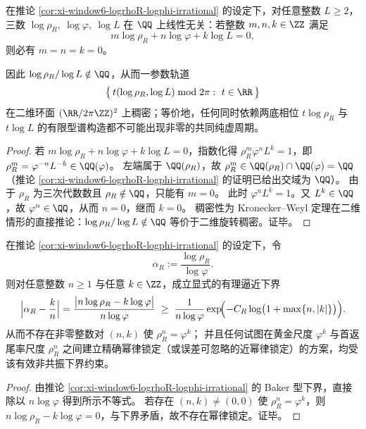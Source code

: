 \begin{corollary}[三底对数的有理线性独立性与二维环面稠密性]\label{cor:xi-window6-logrhoR-logphi-logL-independent}
在推论 \ref{cor:xi-window6-logrhoR-logphi-irrational} 的设定下，对任意整数 \(L\ge 2\)，三数
\(
\log\rho_R,\ \log\varphi,\ \log L
\)
在 \(\QQ\) 上线性无关：若整数 \(m,n,k\in\ZZ\) 满足
\[
m\log\rho_R+n\log\varphi+k\log L=0,
\]
则必有 \(m=n=k=0\)。
\par
因此 \(\log\rho_R/\log L\notin\QQ\)，从而一参数轨道
\[
\bigl\{\,t(\log\rho_R,\log L)\bmod 2\pi:\ t\in\RR\,\bigr\}
\]
在二维环面 \((\RR/2\pi\ZZ)^2\) 上稠密；等价地，任何同时依赖两底相位 \(t\log\rho_R\) 与 \(t\log L\) 的有限型谱构造都不可能出现非零的共同纯虚周期。
\end{corollary}
\begin{proof}
若 \(m\log\rho_R+n\log\varphi+k\log L=0\)，指数化得
\(
\rho_R^{m}\varphi^{n}L^{k}=1
\)，即
\(
\rho_R^{m}=\varphi^{-n}L^{-k}\in\QQ(\varphi)
\)。
左端属于 \(\QQ(\rho_R)\)，故 \(\rho_R^{m}\in \QQ(\rho_R)\cap\QQ(\varphi)=\QQ\)（推论 \ref{cor:xi-window6-logrhoR-logphi-irrational} 的证明已给出交域为 \(\QQ\)）。
由于 \(\rho_R\) 为三次代数数且 \(\rho_R\notin\QQ\)，只能有 \(m=0\)。
此时 \(\varphi^{n}L^{k}=1\)。又 \(L^{k}\in\QQ\)，故 \(\varphi^{n}\in\QQ\)，从而 \(n=0\)，继而 \(k=0\)。
稠密性为 Kronecker--Weyl 定理在二维情形的直接推论：\(\log\rho_R/\log L\notin\QQ\) 等价于二维旋转稠密。证毕。
\end{proof}

\begin{corollary}[有效有理逼近下界与幂律锁定排除]\label{cor:xi-window6-alphaR-rational-approx-bound}
在推论 \ref{cor:xi-window6-logrhoR-logphi-irrational} 的设定下，令
\[
\alpha_R:=\frac{\log\rho_R}{\log\varphi}.
\]
则对任意整数 \(n\ge 1\) 与任意 \(k\in\ZZ\)，成立显式的有理逼近下界
\[
\Bigl\lvert \alpha_R-\frac{k}{n}\Bigr\rvert
=\frac{\bigl|n\log\rho_R-k\log\varphi\bigr|}{n\log\varphi}
\;\ge\;
\frac{1}{n\log\varphi}\exp\!\Bigl(-C_R\log\bigl(1+\max\{n,|k|\}\bigr)\Bigr).
\]
从而不存在非零整数对 \((n,k)\) 使 \(\rho_R^n=\varphi^k\)；
并且任何试图在黄金尺度 \(\varphi^k\) 与首返尾率尺度 \(\rho_R^n\) 之间建立精确幂律锁定（或误差可忽略的近幂律锁定）的方案，均受该有效非共振下界约束。
\end{corollary}
\begin{proof}
由推论 \ref{cor:xi-window6-logrhoR-logphi-irrational} 的 Baker 型下界，直接除以 \(n\log\varphi\) 得到所示不等式。
若存在 \((n,k)\neq(0,0)\) 使 \(\rho_R^n=\varphi^k\)，则 \(n\log\rho_R-k\log\varphi=0\)，与下界矛盾，故不存在幂律锁定。证毕。
\end{proof}

